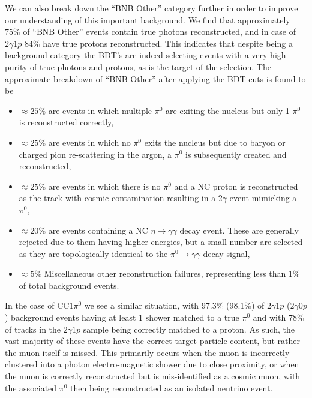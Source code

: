 We can also break down the ``BNB Other'' category further in order to improve our understanding of this important background. We find that approximately $75\%$ of ``BNB Other'' events contain true photons reconstructed, and in case of $2\gamma1p$ 84\% have true protons reconstructed. This indicates that despite being a background category the BDT's are indeed selecting events with a very high purity of true photons and protons, as is the target of the selection. The approximate breakdown of ``BNB Other'' after applying the BDT cuts is found to be

\begin{itemize}
    \item $\approx 25\%$ are events in which multiple $\pi^0$ are exiting the nucleus but only 1 $\pi^0$ is reconstructed correctly,
    \item $\approx 25\%$ are events in which no $\pi^0$ exits the nucleus but due to baryon or charged pion re-scattering in the argon, a $\pi^0$ is subsequently created and reconstructed,  
    \item $\approx 25\%$ are events in which there is no $\pi^0$ and a NC proton is reconstructed as the track with cosmic contamination resulting in a $2\gamma$ event mimicking a $\pi^0$,
    \item $\approx 20\%$ are events containing a NC $\eta \rightarrow \gamma \gamma$ decay event. These are generally rejected due to them having higher energies, but a small number are selected as they are topologically identical to the $\pi^0\rightarrow \gamma\gamma$ decay signal, 
    \item $\approx 5\%$ Miscellaneous other reconstruction failures, representing less than 1\% of total background events.  
\end{itemize}

In the case of CC$1\pi^0$ we see a similar situation, with 97.3\% (98.1\%) of $2\gamma1p$  ($2\gamma0p$) background events having at least 1 shower matched to a true $\pi^0$ and with 78\% of tracks in the $2\gamma1p$ sample being correctly matched to a proton. As such, the vast majority of these events have the correct target particle content, but rather the muon itself is missed. This primarily occurs when the muon is incorrectly clustered into a photon electro-magnetic shower due to close proximity, or when the muon is correctly reconstructed but is mis-identified as a cosmic muon, with the associated $\pi^0$ then being reconstructed as an isolated neutrino event.

